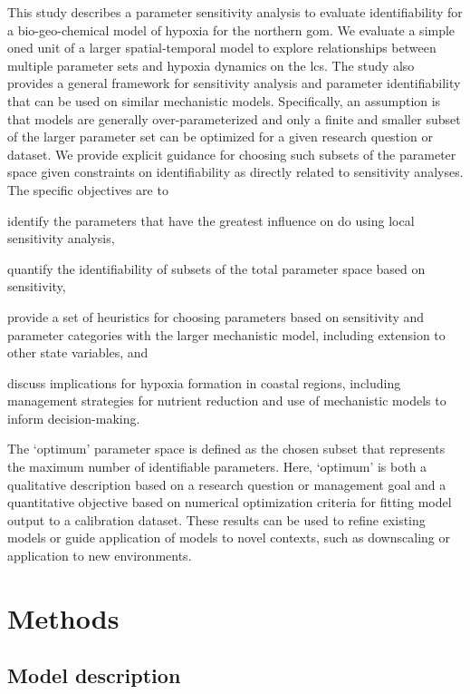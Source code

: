 \documentclass[letterpaper,12pt,oneside]{article}\usepackage[]{graphicx}\usepackage[]{color}
\begin{document}
This study describes a parameter sensitivity analysis to evaluate identifiability for a bio-geo-chemical model of hypoxia for the northern \ac{gom}.  We evaluate a simple \ac{oned} unit of a larger spatial-temporal model to explore relationships between multiple parameter sets and hypoxia dynamics on the \ac{lcs}.  The study also provides a general framework for sensitivity analysis and parameter identifiability that can be used on similar mechanistic models.  Specifically, an assumption is that models are generally over-parameterized and only a finite and smaller subset of the larger parameter set can be optimized for a given research question or dataset.  We provide explicit guidance for choosing such subsets of the parameter space given constraints on identifiability as directly related to sensitivity analyses.  The specific objectives are to \begin{inparaenum}[1\upshape)]
\item identify the parameters that have the greatest influence on \ac{do} using local sensitivity analysis,
\item quantify the identifiability of subsets of the total parameter space based on sensitivity,
\item provide a set of heuristics for choosing parameters based on sensitivity and parameter categories with the larger mechanistic model, including extension to other state variables, and 
\item discuss implications for hypoxia formation in coastal regions, including management strategies for nutrient reduction and use of mechanistic models to inform decision-making.
\end{inparaenum}
The `optimum' parameter space is defined as the chosen subset that represents the maximum number of identifiable parameters.  Here, `optimum' is both a qualitative description based on a research question or management goal and a quantitative objective based on numerical optimization criteria for fitting model output to a calibration dataset.  These results can be used to refine existing models or guide application of models to novel contexts, such as downscaling or application to new environments. 

\section{Methods}

\subsection{Model description}
\end{document}
